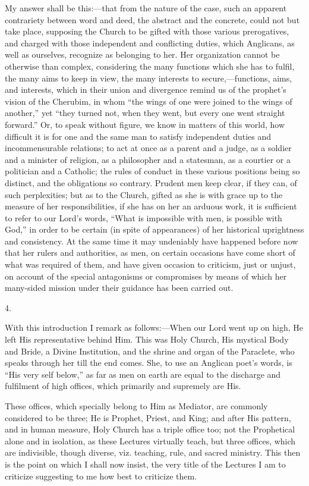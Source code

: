 My answer shall be this:—that from the nature of the case, such
an apparent contrariety between word and deed, the abstract and the
concrete, could not but take place, supposing the Church to be gifted
with those various prerogatives, and charged with those independent
and conflicting duties, which Anglicans, as well as ourselves,
recognize as belonging to her. Her organization cannot be otherwise
than complex, considering the many functions which she has to fulfil,
the many aims to keep in view, the many interests to secure,—functions,
aims, and interests, which in their union and divergence remind us of
the prophet's vision of the Cherubim, in whom ``the wings of one
were joined to the wings of another,'' yet ``they turned not,
when they went, but every one went straight forward.'' Or, to
speak without figure, we know in matters of this world, how difficult
it is for one and the same man to satisfy independent duties and
incommensurable relations; to act at once as a parent and a judge, as
a soldier and a minister of religion, as a philosopher and a
statesman, as a courtier or a politician and a Catholic; the
rules of conduct in these various positions being so distinct, and the
obligations so contrary. Prudent men keep clear, if they can, of such
perplexities; but as to the Church, gifted as she is with grace up to
the measure of her responsibilities, if she has on her an arduous
work, it is sufficient to refer to our Lord's words, ``What is
impossible with men, is possible with God,'' in order to be
certain (in spite of appearances) of her historical uprightness and
consistency. At the same time it may undeniably have happened before
now that her rulers and authorities, as men, on certain occasions have
come short of what was required of them, and have given occasion to
criticism, just or unjust, on account of the special antagonisms or
compromises by means of which her many-sided mission under their
guidance has been carried out.

4.

With this introduction I remark as follows:—When our Lord went up
on high, He left His representative behind Him. This was Holy Church,
His mystical Body and Bride, a Divine Institution, and the shrine and
organ of the Paraclete, who speaks through her till the end comes.
She, to use an Anglican poet's words, is ``His very self
below,'' as far as men on earth are equal to the discharge and
fulfilment of high offices, which primarily and supremely are His.

These offices, which specially belong to Him as Mediator, are
commonly considered to be three; He is Prophet, Priest, and King; and
after His pattern, and in human measure, Holy Church has a triple
office too; not the Prophetical alone and in isolation, as these
Lectures virtually teach, but three offices, which are indivisible,
though diverse, viz. teaching, rule, and sacred ministry. This then
is the point on which I shall now insist, the very title of the
Lectures I am to criticize suggesting to me how best to criticize
them.

